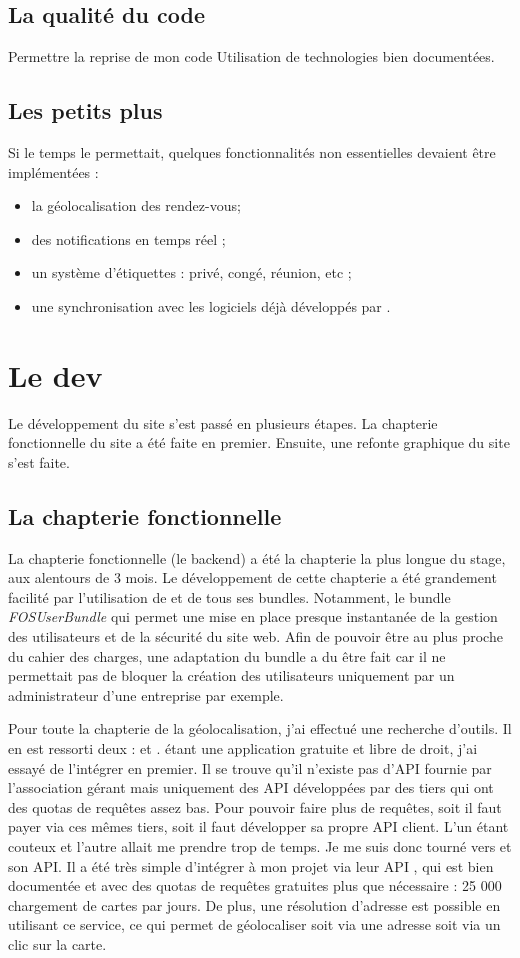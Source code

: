 \documentclass[a4paper, 11pt]{report}
\begin{document}
        \subsection{La qualité du code}
        Permettre la reprise de mon code
        Utilisation de technologies bien documentées.
    \subsection{Les petits plus}
    Si le temps le permettait, quelques fonctionnalités non essentielles devaient être implémentées :
    \begin{itemize}
        \item la géolocalisation des rendez-vous;
        \item des notifications en temps réel ;
        \item un système d'étiquettes : privé, congé, réunion, etc ;
        \item une synchronisation avec les logiciels déjà développés par \logilink.
    \end{itemize}

\section{Le dev}
Le développement du site \agenda s'est passé en plusieurs étapes. La chapterie fonctionnelle du site a été faite en premier. Ensuite, une refonte graphique du site s'est faite.
    \subsection{La chapterie fonctionnelle}
    La chapterie fonctionnelle (le backend) a été la chapterie la plus longue du stage, aux alentours de 3 mois. Le développement de cette chapterie a été grandement facilité par l'utilisation de \symfony et de tous ses bundles. Notamment, le bundle \textit{FOSUserBundle} qui permet une mise en place presque instantanée de la gestion des utilisateurs et de la sécurité du site web. Afin de pouvoir être au plus proche du cahier des charges, une adaptation du bundle a du être fait car il ne permettait pas de bloquer la création des utilisateurs uniquement par un administrateur d'une entreprise par exemple.

    Pour toute la chapterie de la géolocalisation, j'ai effectué une recherche d'outils. Il en est ressorti deux : \osm et \gmap. \osm étant une application gratuite et libre de droit, j'ai essayé de l'intégrer en premier. Il se trouve qu'il n'existe pas d'API fournie par l'association gérant \osm mais uniquement des API développées par des tiers qui ont des quotas de requêtes assez bas. Pour pouvoir faire plus de requêtes, soit il faut payer via ces mêmes tiers, soit il faut développer sa propre API client. L'un étant couteux et l'autre allait me prendre trop de temps. Je me suis donc tourné vers \gmap et son API. Il a été très simple d'intégrer \gmap à mon projet via leur API \javascript, qui est bien documentée et avec des quotas de requêtes gratuites plus que nécessaire : 25 000 chargement de cartes par jours. De plus, une résolution d'adresse est possible en utilisant ce service, ce qui permet de géolocaliser soit via une adresse soit via un clic sur la carte.
\end{document}
